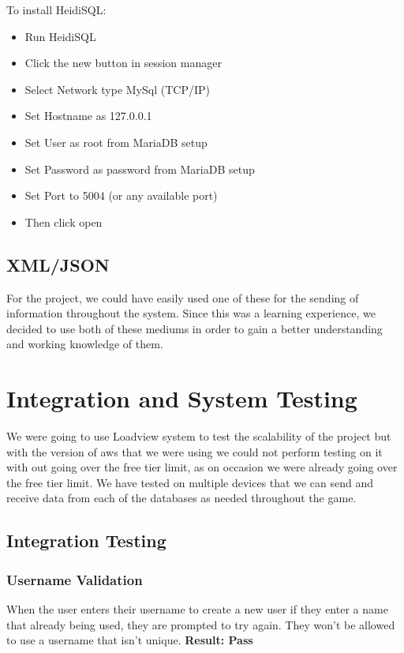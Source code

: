 To install HeidiSQL:
\begin{itemize}
\item Run HeidiSQL
\item Click the new button in session manager
\item Select Network type MySql (TCP/IP)
\item Set Hostname as 127.0.0.1
\item Set User as root from MariaDB setup 
\item Set Password as password from MariaDB setup 
\item Set Port to 5004 (or any available port)
\item Then click open
\end{itemize}
\newpage
\subsection{XML/JSON}
For the project, we could have easily used one of these for the sending of information throughout the system. Since this was a learning experience, we decided to use both of these mediums in order to gain a better understanding and working knowledge of them. 
\section{Integration and System Testing}


We were going to use Loadview system to test the scalability of the project but with the version of aws that we were using we could not perform testing on it with out going over the free tier limit, as on occasion we were already going over the free tier limit. \newline 
We have tested on multiple devices that we can send and receive data from each of the databases as needed throughout the game. \newline

\subsection{Integration Testing } \newline

\subsubsection{Username Validation} \newline
When the user enters their username to create a new user if they enter a name that already being used, they are prompted to try again. They won’t be allowed to use a username that isn’t unique.  \newline
\textbf{Result: Pass} 

